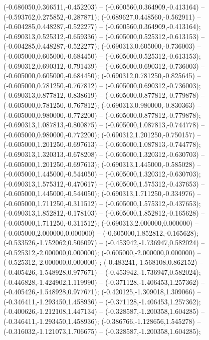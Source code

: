  (-0.686050,0.366511,-0.452203) -- (-0.600560,0.364909,-0.413164) -- (-0.593762,0.275852,-0.287871);
 (-0.689627,0.448560,-0.562911) -- (-0.604285,0.448287,-0.522277) -- (-0.600560,0.364909,-0.413164);
 (-0.690313,0.525312,-0.659336) -- (-0.605000,0.525312,-0.613153) -- (-0.604285,0.448287,-0.522277);
 (-0.690313,0.605000,-0.736003) -- (-0.605000,0.605000,-0.684450) -- (-0.605000,0.525312,-0.613153);
 (-0.690312,0.690312,-0.791439) -- (-0.605000,0.690312,-0.736003) -- (-0.605000,0.605000,-0.684450);
 (-0.690312,0.781250,-0.825645) -- (-0.605000,0.781250,-0.767812) -- (-0.605000,0.690312,-0.736003);
 (-0.690313,0.877812,-0.838619) -- (-0.605000,0.877812,-0.779878) -- (-0.605000,0.781250,-0.767812);
 (-0.690313,0.980000,-0.830363) -- (-0.605000,0.980000,-0.772200) -- (-0.605000,0.877812,-0.779878);
 (-0.690313,1.087813,-0.800875) -- (-0.605000,1.087813,-0.744778) -- (-0.605000,0.980000,-0.772200);
 (-0.690312,1.201250,-0.750157) -- (-0.605000,1.201250,-0.697613) -- (-0.605000,1.087813,-0.744778);
 (-0.690313,1.320313,-0.678208) -- (-0.605000,1.320312,-0.630703) -- (-0.605000,1.201250,-0.697613);
 (-0.690313,1.445000,-0.585028) -- (-0.605000,1.445000,-0.544050) -- (-0.605000,1.320312,-0.630703);
 (-0.690313,1.575312,-0.470617) -- (-0.605000,1.575312,-0.437653) -- (-0.605000,1.445000,-0.544050);
 (-0.690313,1.711250,-0.334976) -- (-0.605000,1.711250,-0.311512) -- (-0.605000,1.575312,-0.437653);
 (-0.690313,1.852812,-0.178103) -- (-0.605000,1.852812,-0.165628) -- (-0.605000,1.711250,-0.311512);
 (-0.690313,2.000000,0.000000) -- (-0.605000,2.000000,0.000000) -- (-0.605000,1.852812,-0.165628);
 (-0.533526,-1.752062,0.506097) -- (-0.453942,-1.736947,0.582024) -- (-0.525312,-2.000000,0.000000);
 (-0.605000,-2.000000,0.000000) -- (-0.525312,-2.000000,0.000000) ;
 (-0.483241,-1.568108,0.862152) -- (-0.405426,-1.548928,0.977671) -- (-0.453942,-1.736947,0.582024);
 (-0.446828,-1.424902,1.119990) -- (-0.371128,-1.406453,1.257362) -- (-0.405426,-1.548928,0.977671);
 (-0.420125,-1.309018,1.309066) -- (-0.346411,-1.293450,1.458936) -- (-0.371128,-1.406453,1.257362);
 (-0.400626,-1.212108,1.447134) -- (-0.328587,-1.200358,1.604285) -- (-0.346411,-1.293450,1.458936);
 (-0.386766,-1.128656,1.545278) -- (-0.316032,-1.121073,1.706675) -- (-0.328587,-1.200358,1.604285);

